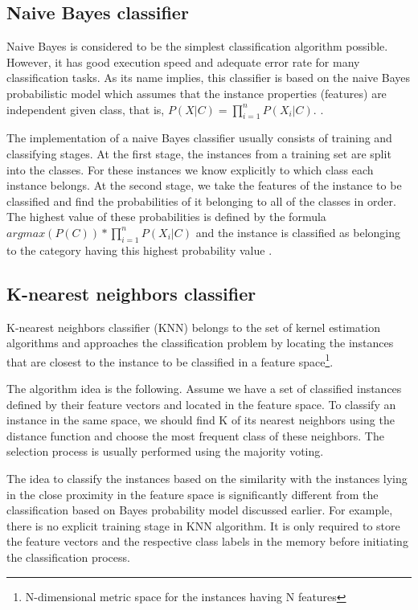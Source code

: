 \documentclass{llncs}
\begin{document}
\subsection{Naive Bayes classifier}

Naive Bayes is considered to be the simplest classification algorithm possible. However, it has good execution speed and adequate error rate for many classification tasks. As its name implies, this classifier is based on the naive Bayes probabilistic model which assumes that the instance properties (features) are independent given class, that is, \(P(X|C) = \prod_{i=1}^nP(X_i|C)\). \cite{Rish}.

The implementation of a naive Bayes classifier usually consists of training and classifying stages. At the first stage, the instances from a training set are split into the classes. For these instances we know explicitly to which class each instance belongs. At the second stage, we take the features of the instance to be classified and find the probabilities of it belonging to all of the classes in order. The highest value of these probabilities is defined by the formula \(argmax(P(C)) * \prod_{i=1}^nP(X_i|C)\) and the instance is classified as belonging to the category having this highest probability value \cite{Manning}\cite{Rish}.

\subsection{K-nearest neighbors classifier}

K-nearest neighbors classifier (KNN) belongs to the set of kernel estimation algorithms and approaches the classification problem by locating the instances that are closest to the instance to be classified in a feature space\footnote{N-dimensional metric space for the instances having N features}\cite{WikiKNN}.

The algorithm idea is the following. Assume we have a set of classified instances defined by their feature vectors and located in the feature space. To classify an instance in the same space, we should find K of its nearest neighbors using the distance function and choose the most frequent class of these neighbors. The selection process is usually performed using the majority voting.

The idea to classify the instances based on the similarity with the instances lying in the close proximity in the feature space is significantly different from the classification based on Bayes probability model discussed earlier. For example, there is no explicit training stage in KNN algorithm. It is only required to store the feature vectors and the respective class labels in the memory before initiating the classification process.
\end{document}
